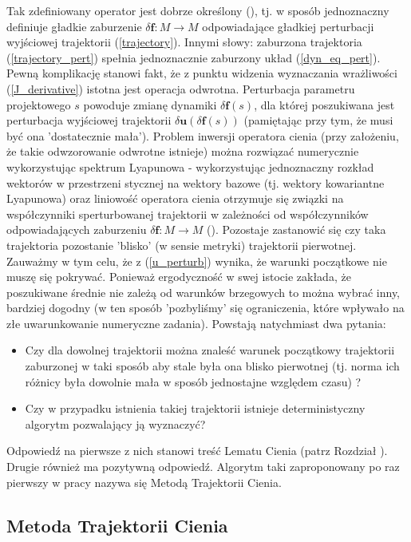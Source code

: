 \documentclass[12pt]{article}
\begin{document}
Tak zdefiniowany operator jest dobrze określony (\cite{Qiqi1}), tj. w sposób jednoznaczny definiuje gładkie zaburzenie $ \delta \textbf{f}: M \rightarrow M $ odpowiadające gładkiej perturbacji wyjściowej trajektorii (\ref{trajectory}). Innymi słowy: zaburzona trajektoria (\ref{trajectory_pert}) spełnia jednoznacznie zaburzony układ (\ref{dyn_eq_pert}). Pewną komplikację stanowi fakt, że z punktu widzenia wyznaczania wrażliwości (\ref{J_derivative}) istotna jest operacja odwrotna. Perturbacja parametru projektowego $ s $ powoduje zmianę dynamiki $ \delta\textbf{f}(s) $, dla której poszukiwana jest perturbacja wyjściowej trajektorii $ \delta \textbf{u}(\delta \textbf{f}(s)) $ (pamiętając przy tym, że musi być ona 'dostatecznie mała'). Problem inwersji operatora cienia (przy założeniu, że takie odwzorowanie odwrotne istnieje) można rozwiązać numerycznie wykorzystując spektrum Lyapunowa - wykorzystując jednoznaczny rozkład wektorów w przestrzeni stycznej na wektory bazowe (tj. wektory kowariantne Lyapunowa) oraz liniowość operatora cienia otrzymuje się związki na współczynniki sperturbowanej trajektorii w zależności od współczynników odpowiadających zaburzeniu $ \delta \textbf{f}: M \rightarrow M $ (\cite{Qiqi1}). Pozostaje zastanowić się czy taka trajektoria pozostanie 'blisko' (w sensie metryki) trajektorii pierwotnej. Zauważmy w tym celu, że z (\ref{u_perturb}) wynika, że warunki początkowe nie muszę się pokrywać. Ponieważ ergodyczność w swej istocie zakłada, że poszukiwane średnie nie zależą od warunków brzegowych to można wybrać inny, bardziej dogodny (w ten sposób 'pozbyliśmy' się ograniczenia, które wpływało na złe uwarunkowanie numeryczne zadania). Powstają natychmiast dwa pytania:
\begin{itemize}
	\item Czy dla dowolnej trajektorii można znaleść warunek początkowy trajektorii zaburzonej w taki sposób aby stale była ona blisko pierwotnej (tj. norma ich różnicy była dowolnie mała w sposób jednostajne względem czasu) ?
	\item Czy w przypadku istnienia takiej trajektorii istnieje deterministyczny algorytm pozwalający ją wyznaczyć?
\end{itemize} 
Odpowiedź na pierwsze z nich stanowi treść Lematu Cienia (patrz Rozdział ). Drugie również ma pozytywną odpowiedź. Algorytm taki zaproponowany po raz pierwszy w pracy \cite{Qiqi2} nazywa się Metodą Trajektorii Cienia.
\subsection{Metoda Trajektorii Cienia} 
\end{document}
